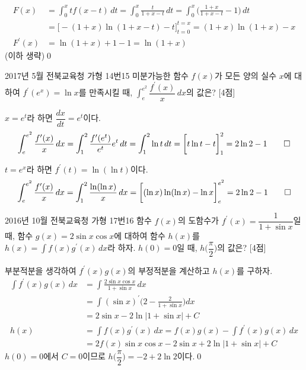 \documentclass{article}
\begin{document}
\begin{sol}[풀이 2]
	\[
		\begin{aligned}
			F(x)&=\int_0^xtf(x-t)\,dt=\int_0^x\frac{t}{1+x-t}\,dt=\int_0^x\biggl(\frac{1+x}{1+x-t}-1\biggr)\,dt\\[3pt]
			&=\biggl[-(1+x)\ln(1+x-t)-t\biggr]_{t=0}^{t=x}=(1+x)\ln(1+x)-x\\[3pt]
			F^{\prime}(x)&=\ln(1+x)+1-1=\ln(1+x)
		\end{aligned}
	\]
	(이하 생략)\qed
\end{sol}

\newpage
\begin{prob}{2017년 5월 전북교육청 가형 14번}{15}
	미분가능한 함수 $f(x)$가 모든 양의 실수 $x$에 대하여 $f^{\prime}(e^x)=\ln x$를 만족시킬 때, $\displaystyle\int_e^{e^2}\dfrac{f^{\prime}(x)}{x}\,dx$의 값은? [4점]
\end{prob}

\begin{sol}[풀이 1]
	$x=e^t$라 하면 $\dfrac{dx}{dt}=e^t$이다.
	\[
		\int_e^{e^2}\frac{f^{\prime}(x)}{x}\,dx=\int_1^2\frac{f^{\prime}(e^t)}{e^t}e^t\,dt=\int_1^2\ln t\,dt=\biggl[t\ln t-t\biggr]_1^2=2\ln 2-1\qed
	\]
\end{sol}

\begin{sol}[풀이 2]
	$t=e^x$라 하면 $f^{\prime}(t)=\ln(\ln t)$이다.
	\[
		\int_e^{e^2}\frac{f^{\prime}(x)}{x}\,dx=\int_1^2\frac{\ln(\ln x)}{x}\,dx=\biggl[(\ln x)\ln(\ln x)-\ln x\biggr]_e^{e^2}=2\ln 2-1\qed
	\]
\end{sol}

\newpage
\begin{prob}{2016년 10월 전북교육청 가형 17번}{16}
	함수 $f(x)$의 도함수가 $f^{\prime}(x)=\dfrac{1}{1+\sin x}$일 때, 함수 $g(x)=2\sin x\cos x$에 대하여 함수 $h(x)$를 $h(x)=\displaystyle\int f(x)g^{\prime}(x)\,dx$라 하자. $h(0)=0$일 때, $h\biggl(\dfrac{\pi}{2}\biggr)$의 값은? [4점]
\end{prob}

\begin{sol}
	부분적분을 생각하여 $f^\prime(x)g(x)$의 부정적분을 계산하고 $h(x)$를 구하자.
	\begin{align*}
		\int f^{\prime}(x)g(x)\,dx&=\int\frac{2\sin x\cos x}{1+\sin x}\,dx\\[3pt]
		&=\int(\sin x)^{\prime}\biggl(2-\frac{2}{1+\sin x}\biggr)dx\\[3pt]
		&=2\sin x-2\ln\vert1+\sin x\vert+C\\[3pt]
		h(x)&=\int f(x)g^{\prime}(x)\,dx=f(x)g(x)-\int f^{\prime}(x)g(x)\,dx\\[3pt]
		&=2f(x)\sin x\cos x-2\sin x+2\ln\vert1+\sin x\vert+C
	\end{align*}
	$h(0)=0$에서 $C=0$이므로 $h\biggl(\dfrac{\pi}{2}\biggr)=-2+2\ln2$이다.\qed
\end{sol}
\end{document}
